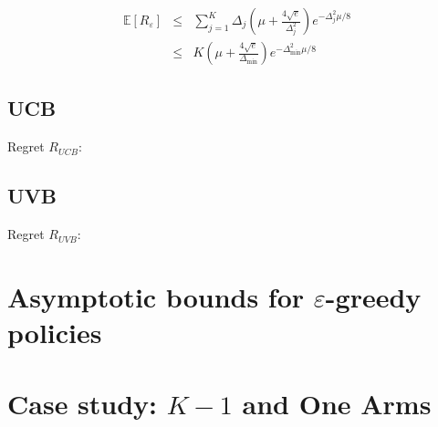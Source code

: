 \documentclass{article}
\newcommand {\IE} {\ensuremath {\mathbb{E}}}
\begin{document}
\begin{eqnarray}
\IE[R_\varepsilon]&\le&\sum_{j=1}^K\Delta_j\left(\mu + \frac {4\sqrt e}
{\Delta_j^2}\right)e^{-\Delta_j^2\mu/8}\nonumber\\
&\le&K\left(\mu + \frac {4\sqrt e}{\Delta_{\min}}\right)e^{-\Delta_{\min}^2\mu/8}
\end{eqnarray}

\subsection{UCB}

Regret $R_{UCB}$:

\subsection{UVB}

Regret $R_{UVB}$:

\section{Asymptotic bounds for $\varepsilon$-greedy policies}


\section{Case study: $K-1$ and One Arms}
\end{document}
